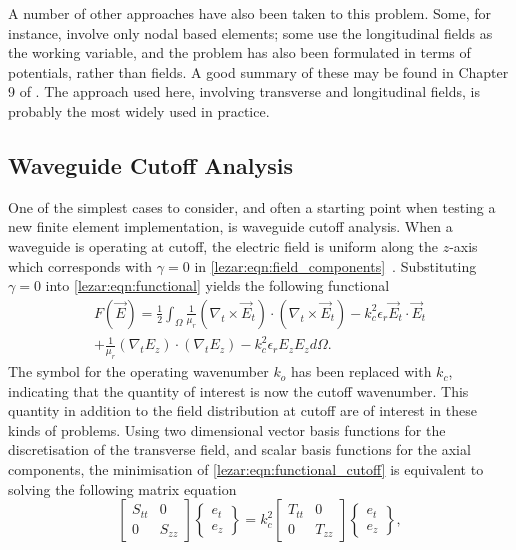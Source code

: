 A number of other approaches have also been taken to this
problem. Some, for instance, involve only nodal based elements; some
use the longitudinal fields as the working variable, and the problem
has also been formulated in terms of potentials, rather than fields. A
good summary of these may be found in Chapter 9 of \cite{ZhuCan2006}. The approach used here, involving transverse and
longitudinal fields, is probably the most widely used in practice.

\subsection{Waveguide Cutoff Analysis}
\label{lezar:sec:cutoff_formulation}
One of the simplest cases to consider, and often a starting point when
testing a new finite element implementation, is waveguide cutoff
analysis. When a waveguide is operating at cutoff, the electric field
is uniform along the $z$-axis which corresponds with $\gamma = 0$ in
\eqref{lezar:eqn:field_components}~\cite{Pozar2005}.  Substituting $\gamma = 0$ into
\eqref{lezar:eqn:functional} yields the following functional
\begin{multline}
    \label{lezar:eqn:functional_cutoff}
    F(\vec{E}) = \frac{1}{2}\int_{\Omega}\frac{1}{\mu_r}(\nabla_t\times{\vec{E}_t})\cdot(\nabla_t\times{\vec{E}_t}) -k_c^2\epsilon_r\vec{E}_t\cdot{\vec{E}_t}\\
    +\frac{1}{\mu_r}(\nabla_t{E_z})\cdot(\nabla_t{E_z})
    -k_c^2\epsilon_r E_z{E_z} d\Omega.
\end{multline}
The symbol for the operating wavenumber
$k_o$ has been replaced with $k_c$, indicating that the
quantity of interest is now the cutoff
wavenumber. This quantity in addition to the
field distribution at cutoff are of interest in these kinds of
problems.  Using two dimensional vector basis functions for the
discretisation of the transverse field, and scalar basis functions for
the axial components, the minimisation of
\eqref{lezar:eqn:functional_cutoff} is equivalent to solving the following
matrix equation
\begin{equation}
    \label{lezar:eqn:matrix_equation_cutoff}
    \begin{bmatrix} S_{tt} & 0\\0 &
    S_{zz}\end{bmatrix}\begin{Bmatrix}e_t\\e_z\end{Bmatrix} =
    k_c^2\begin{bmatrix} T_{tt} & 0\\0 &
    T_{zz}\end{bmatrix}\begin{Bmatrix}e_t\\e_z\end{Bmatrix},
\end{equation}
